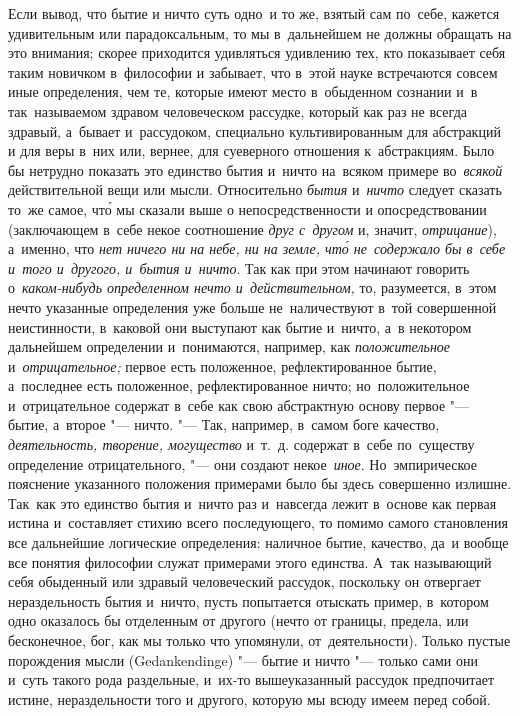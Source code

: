 Если вывод, что бытие и ничто суть одно~и то же, взятый сам по~себе, кажется
удивительным или парадоксальным, то мы в~дальнейшем не должны обращать на это
внимания; скорее приходится удивляться удивлению тех, кто показывает себя таким
новичком в~философии и забывает, что в~этой науке встречаются совсем иные
определения, чем те, которые имеют место в~обыденном сознании и~в
так~называемом здравом человеческом рассудке, который как раз не всегда
здравый, а~бывает и~рассудоком, специально культивированным для абстракций и
для веры в~них или, вернее, для суеверного отношения к~абстракциям. Было бы
нетрудно показать это единство бытия и~ничто на~всяком примере во~{\em всякой}
действительной вещи или мысли. Относительно {\em бытия} и~{\em ничто} следует
сказать то~же самое, чт\'{о} мы сказали выше о непосредственности и
опосредствовании (заключающем в~себе некое соотношение {\em друг с~другом} и,
значит, {\em отрицание}), а~именно, что {\em нет ничего ни на небе, ни на
земле, чт\'{о} не~содержало бы в~себе и~того и~другого, и~бытия и~ничто}. Так
как при этом начинают говорить о~{\em каком-нибудь определенном нечто
и~действительном,} то, разумеется, в~этом нечто указанные определения уже
больше не~наличествуют в~той совершенной неистинности, в~каковой они выступают
как бытие и~ничто, а~в некотором дальнейшем определении и~понимаются, например,
как {\em положительное} и~{\em отрицательное;} первое есть положенное,
рефлектированное бытие, а~последнее есть положенное, рефлектированное ничто;
но~положительное и~отрицательное содержат в~себе как свою абстрактную основу
первое "--- бытие, а~второе "--- ничто. "--- Так, например, в~самом боге
качество, {\em деятельность, творение, могущество} и~т.~д. содержат в~себе
по~существу определение отрицательного, "--- они создают некое~{\em иное}.
Но~эмпирическое пояснение указанного положения примерами было бы здесь
совершенно излишне. Так~как это единство бытия и~ничто раз и~навсегда лежит
в~основе как первая истина и~составляет стихию всего последующего, то помимо
самого становления все дальнейшие логические определения: наличное бытие,
качество, да~и вообще все понятия философии служат примерами этого единства.
А~так называющий себя обыденный или здравый человеческий рассудок, поскольку он
отвергает нераздельность бытия и~ничто, пусть попытается отыскать пример,
в~котором одно оказалось бы отделенным от другого (нечто от границы, предела,
или бесконечное, бог, как мы только что упомянули, от~деятельности). Только
пустые порождения мысли (Gedank\-end\-inge) "--- бытие и ничто "--- только сами
они и~суть такого рода раздельные, и~их-то вышеуказанный рассудок предпочитает
истине, нераздельности того и другого, которую мы всюду имеем перед собой.

